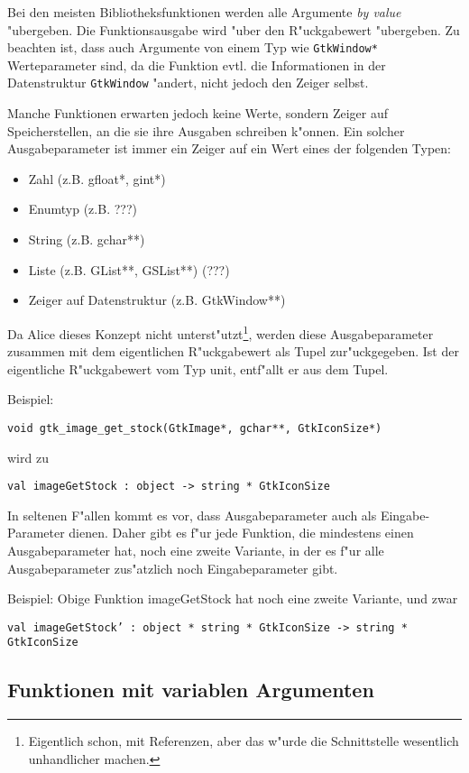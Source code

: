 \documentclass{article}
\begin{document}
Bei den meisten Bibliotheksfunktionen werden alle Argumente \textit{by value}
"ubergeben. Die Funktionsausgabe wird "uber den R"uckgabewert "ubergeben.
Zu beachten ist, dass auch Argumente von einem Typ wie \texttt{GtkWindow*}
Werteparameter sind, da die Funktion evtl. die Informationen in der
Datenstruktur \texttt{GtkWindow} "andert, nicht jedoch den Zeiger selbst.

Manche Funktionen erwarten jedoch keine Werte, sondern Zeiger auf
Speicherstellen, an die sie ihre Ausgaben schreiben k"onnen. Ein solcher
Ausgabeparameter ist immer ein Zeiger auf ein Wert eines der folgenden Typen:

\begin{itemize}
\item Zahl (z.B. gfloat*, gint*)
\item Enumtyp (z.B. ???)
\item String (z.B. gchar**)
\item Liste (z.B. GList**, GSList**) (???)
\item Zeiger auf Datenstruktur (z.B. GtkWindow**)
\end{itemize}

Da Alice dieses Konzept nicht unterst"utzt\footnote{Eigentlich schon, mit
Referenzen, aber das w"urde die Schnittstelle wesentlich unhandlicher machen.},
werden diese Ausgabeparameter zusammen mit dem eigentlichen R"uckgabewert
als Tupel zur"uckgegeben. Ist der eigentliche R"uckgabewert vom Typ unit,
entf"allt er aus dem Tupel.

Beispiel:

\texttt{void gtk\_image\_get\_stock(GtkImage*, gchar**, GtkIconSize*)}

wird zu 

\texttt{val imageGetStock : object -> string * GtkIconSize}

In seltenen F"allen kommt es vor, dass Ausgabeparameter auch als Eingabe-
Parameter dienen. Daher gibt es f"ur jede Funktion, die mindestens
einen Ausgabeparameter hat, noch eine zweite Variante, in der es f"ur
alle Ausgabeparameter zus"atzlich noch Eingabeparameter gibt.

Beispiel: Obige Funktion imageGetStock hat noch eine zweite Variante, und zwar

\texttt{val imageGetStock' : object * string * GtkIconSize 
        -> string * GtkIconSize}


\subsection{Funktionen mit variablen Argumenten}
\end{document}
